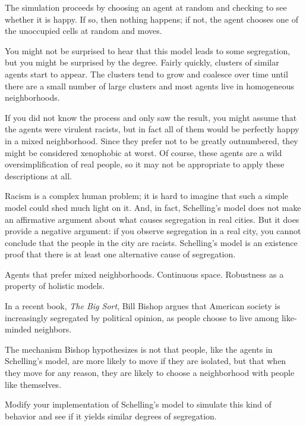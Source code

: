 \documentclass[10pt]{book}
\begin{document}
The simulation proceeds by choosing an agent at random and checking
to see whether it is happy.  If so, then nothing happens; if not,
the agent chooses one of the unoccupied cells at
random and moves.

You might not be surprised to hear that this model leads to some
segregation, but you might be surprised by the degree.  Fairly
quickly, clusters of similar agents start to appear.  The clusters
tend to grow and coalesce over time until there are a small number
of large clusters and most agents live in homogeneous
neighborhoods.

If you did not know the process and only saw the result, you might
assume that the agents were virulent racists, but in fact all of them
would be perfectly happy in a mixed neighborhood.  Since they prefer
not to be greatly outnumbered, they might be considered xenophobic at
worst.  Of course, these agents are a wild oversimplification of real
people, so it may not be appropriate to apply these descriptions at
all.

Racism is a complex human problem; it is hard to imagine that such a
simple model could shed much light on it.
And, in fact, Schelling's model does not make an affirmative
argument about what causes segregation in real cities.  But it
does provide a negative argument: if you observe
segregation in a real city, you cannot conclude that the people
in the city are racists.  Schelling's model is an existence
proof that there is at least one alternative cause of segregation.


\begin{ex}

Agents that prefer mixed neighborhoods.  Continuous space.
Robustness as a property of holistic models.

\end{ex}


\begin{ex}

In a recent book, {\em The Big Sort}, Bill Bishop argues that
American society is increasingly segregated by political
opinion, as people choose to live among like-minded neighbors.

The mechanism Bishop hypothesizes is not that people, like the agents
in Schelling's model, are more likely to move if they are
isolated, but that when they move for any reason, they are
likely to choose a neighborhood with people like themselves.

Modify your implementation of Schelling's model to simulate
this kind of behavior and see if it yields similar degrees of
segregation. 

\end{ex}
\end{document}
